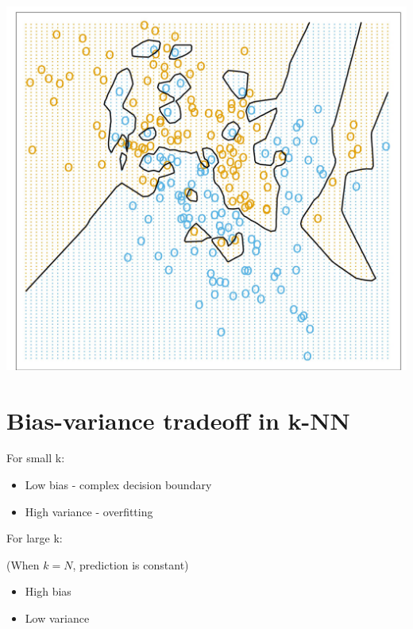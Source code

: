 \documentclass[10pt]{article}
\begin{document}
\begin{center}
\includegraphics[max width=\textwidth]{2023_12_30_f937b0007b5d87b39f79g-21}
\end{center}

\section*{Bias-variance tradeoff in k-NN}
For small k:

\begin{itemize}
  \item Low bias - complex decision boundary
  \item High variance - overfitting
\end{itemize}

For large k:

(When $k=N$, prediction is constant)

\begin{itemize}
  \item High bias
  \item Low variance
\end{itemize}
\end{document}
